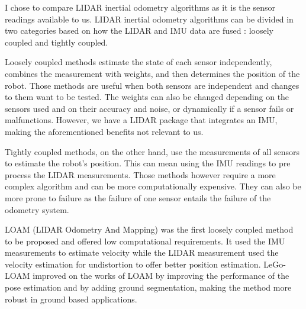\documentclass[12pt]{article}
\begin{document}
        I chose to compare LIDAR inertial odometry algorithms as it is the sensor readings available to us. LIDAR inertial odometry algorithms can be divided in two categories based on how the LIDAR and IMU data are fused : loosely coupled and tightly coupled.

        Loosely coupled methods estimate the state of each sensor independently, combines the measurement with weights, and then determines the position of the robot. Those methods are useful when both sensors are independent and changes to them want to be tested. The weights can also be changed depending on the sensors used and on their accuracy and noise, or dynamically if a sensor fails or malfunctions. However, we have a LIDAR package that integrates an IMU, making the aforementioned benefits not relevant to us.

        Tightly coupled methods, on the other hand, use the measurements of all sensors to estimate the robot's position. This can mean using the IMU readings to pre process the LIDAR measurements. Those methods however require a more complex algorithm and can be more computationally expensive. They can also be more prone to failure as the failure of one sensor entails the failure of the odometry system.


        LOAM (LIDAR Odometry And Mapping) \cite{lee2024lidar} was the first loosely coupled method to be proposed and offered low computational requirements. It used the IMU measurements to estimate velocity while the LIDAR measurement used the velocity estimation for undistortion to offer better position estimation. LeGo-LOAM \cite{shan2018lego} improved on the works of LOAM by improving the performance of the pose estimation and by adding ground segmentation, making the method more robust in ground based applications.
\end{document}
